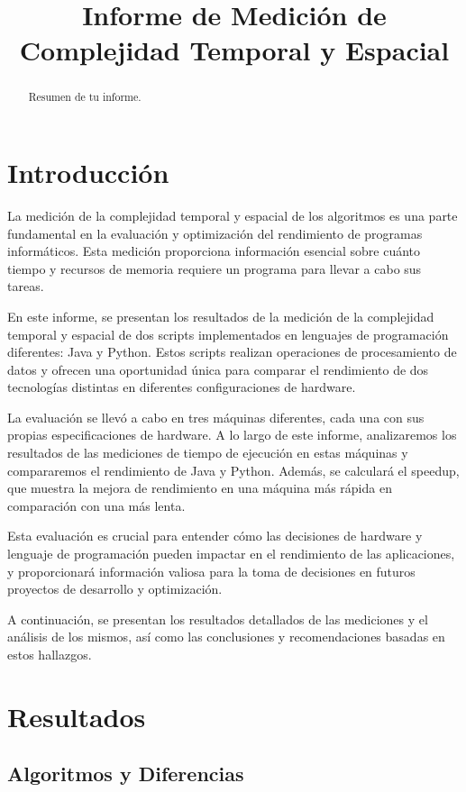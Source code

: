 \documentclass[conference]{IEEEtran}
\title{Informe de Medición de Complejidad Temporal y Espacial}
\author{\IEEEauthorblockN{Arturo Daza, Sebastian Samaniego, Giovanny Gonzalez}}
\begin{document}
\maketitle

\begin{abstract}
Resumen de tu informe.
\end{abstract}

\section{Introducción}
La medición de la complejidad temporal y espacial de los algoritmos es una parte fundamental en la evaluación y optimización del rendimiento de programas informáticos. Esta medición proporciona información esencial sobre cuánto tiempo y recursos de memoria requiere un programa para llevar a cabo sus tareas.

En este informe, se presentan los resultados de la medición de la complejidad temporal y espacial de dos scripts implementados en lenguajes de programación diferentes: Java y Python. Estos scripts realizan operaciones de procesamiento de datos y ofrecen una oportunidad única para comparar el rendimiento de dos tecnologías distintas en diferentes configuraciones de hardware.

La evaluación se llevó a cabo en tres máquinas diferentes, cada una con sus propias especificaciones de hardware. A lo largo de este informe, analizaremos los resultados de las mediciones de tiempo de ejecución en estas máquinas y compararemos el rendimiento de Java y Python. Además, se calculará el speedup, que muestra la mejora de rendimiento en una máquina más rápida en comparación con una más lenta.

Esta evaluación es crucial para entender cómo las decisiones de hardware y lenguaje de programación pueden impactar en el rendimiento de las aplicaciones, y proporcionará información valiosa para la toma de decisiones en futuros proyectos de desarrollo y optimización.

A continuación, se presentan los resultados detallados de las mediciones y el análisis de los mismos, así como las conclusiones y recomendaciones basadas en estos hallazgos.

\section{Resultados}

\subsection{Algoritmos y Diferencias}
\end{document}
